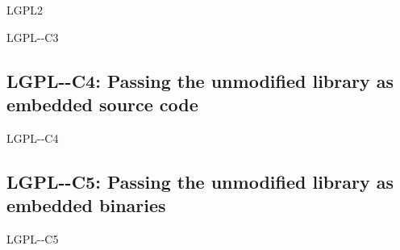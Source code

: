 \begin{license}{LGPL2}
\begin{lsuc}{LGPL-\ver-C3}
  \useCaseThree

  \begin{lsucrequires}
    \lsucmandatory{\keepLicensingElements}
    \lsucmandatory{\lgpltwoEnsureCopyrightNoticeBinary}
    \lsucmandatory{\giveLicense}\passingFilesCorrectly
    \lsucmandatory{\makeUnmodifiedSourceAvailable}
    \lsucmandatory{\describeHowToGetSource}
    \lsucoptional{\retainCopyrightNotices}
    \lsucoptional{\addToDocumentation}
  \end{lsucrequires}

  \lsucprohibitsnothing
\end{lsuc}

\subsection{LGPL-\ver-C4: Passing the unmodified library as embedded source code}
\begin{lsuc}{LGPL-\ver-C4}

  \useCaseFour

  \begin{lsucrequires}
    \lsucmandatory{\keepLicensingElements}
    \lsucmandatory{\lgpltwoEnsureCopyrightNoticeSource}
    \lsucmandatory{\giveLicense}\passingFilesCorrectly
    \lsucoptional{\addToDocumentation}
    \lsucoptional{\retainCopyrightNotices}
  \end{lsucrequires}

  \lsucprohibitsnothing
\end{lsuc}

\subsection{LGPL-\ver-C5: Passing the unmodified library as embedded binaries}
\begin{lsuc}{LGPL-\ver-C5}

  \useCaseFive

  \begin{lsucrequires}
    \lsucmandatory{\keepLicensingElements}
    \lsucmandatory{\lgpltwoEnsureCopyrightNoticeBinary}
    \lsucmandatory{\giveLicense}\passingFilesCorrectly
    \lsucmandatory{\makeUnmodifiedSourceAvailable}
    \lsucmandatory{\describeHowToGetSource}
    \lsucmandatory{\allowRelinking}
    \lsucoptional{\addToDocumentation}
    \lsucoptional{\retainCopyrightNotices}
  \end{lsucrequires}


\end{lsuc}
\end{license}
